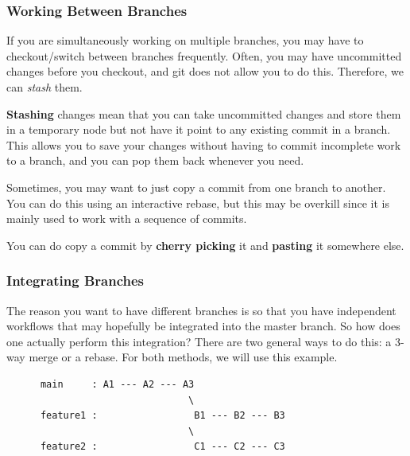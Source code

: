   \subsubsection{Working Between Branches} 

    If you are simultaneously working on multiple branches, you may have to checkout/switch between branches frequently. Often, you may have uncommitted changes before you checkout, and git does not allow you to do this. Therefore, we can \textit{stash} them. 

    \begin{definition}[Stash]
      \textbf{Stashing} changes mean that you can take uncommitted changes and store them in a temporary node but not have it point to any existing commit in a branch. This allows you to save your changes without having to commit incomplete work to a branch, and you can pop them back whenever you need. 
    \end{definition} 

    Sometimes, you may want to just copy a commit from one branch to another. You can do this using an interactive rebase, but this may be overkill since it is mainly used to work with a sequence of commits. 

    \begin{definition}
      You can do copy a commit by \textbf{cherry picking} it and \textbf{pasting} it somewhere else. 
    \end{definition} 

  \subsubsection{Integrating Branches} 

    The reason you want to have different branches is so that you have independent workflows that may hopefully be integrated into the master branch. So how does one actually perform this integration? There are two general ways to do this: a 3-way merge or a rebase. For both methods, we will use this example. 
    \begin{lstlisting}
      main     : A1 --- A2 --- A3
                                \
      feature1 :                 B1 --- B2 --- B3
                                \
      feature2 :                 C1 --- C2 --- C3
    \end{lstlisting}

